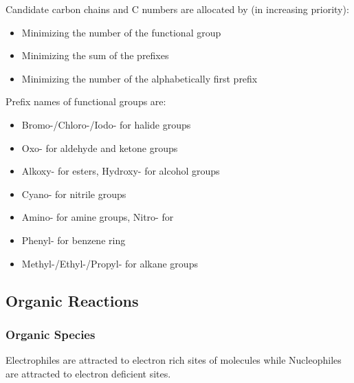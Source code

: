 \documentclass[../main]{subfiles}
\begin{document}
	Candidate carbon chains and C numbers are allocated by (in increasing priority):
	\begin{itemize}
		\item Minimizing the number of the functional group
		\item Minimizing the sum of the prefixes
		\item Minimizing the number of the alphabetically first prefix
	\end{itemize}

	Prefix names of functional groups are:
	\begin{itemize}
		\item Bromo-/Chloro-/Iodo- for halide groups
		\item Oxo- for aldehyde and ketone groups
		\item Alkoxy- for esters, Hydroxy- for alcohol groups
		\item Cyano- for nitrile groups
		\item Amino- for amine groups, Nitro- for 
		\item Phenyl- for benzene ring
		\item Methyl-/Ethyl-/Propyl- for alkane groups
	\end{itemize}

	\subsection{Organic Reactions}

	\subsubsection{Organic Species}



	Electrophiles are attracted to electron rich sites of molecules while Nucleophiles are attracted to electron deficient sites.
\end{document}
